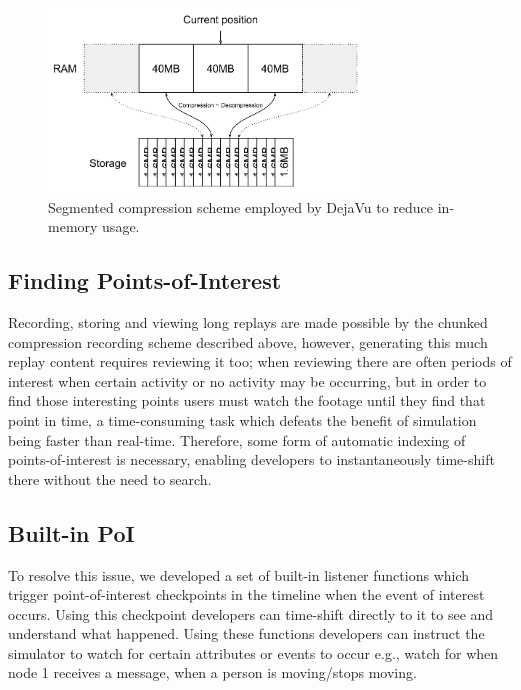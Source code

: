 \begin{figure}[ht]
\centering
  \includegraphics[width=0.75\textwidth]{img/DejaVuCompression.pdf}
  \caption{Segmented compression scheme employed by DejaVu to reduce in-memory usage.}
  \label{fig:compression}
\end{figure}


\subsection{Finding Points-of-Interest} %
\label{sub:indexing_points_of_interest}
Recording, storing and viewing long replays are made possible by the chunked compression recording scheme described above, however, generating this much replay content requires reviewing it too; when reviewing there are often periods of interest when certain activity or no activity may be occurring, but in order to find those interesting points users must watch the footage until they find that point in time, a time-consuming task which defeats the benefit of simulation being faster than real-time. Therefore, some form of automatic indexing of points-of-interest is necessary, enabling developers to instantaneously time-shift there without the need to search.

\subsection{Built-in PoI} %
\label{sub:built_in_poi}

To resolve this issue, we developed a set of built-in listener functions which trigger point-of-interest checkpoints in the timeline when the event of interest occurs. Using this checkpoint developers can time-shift directly to it to see and understand what happened. Using these functions developers can instruct the simulator to watch for certain attributes or events to occur e.g., watch for when node 1 receives a message, when a person is moving/stops moving.

